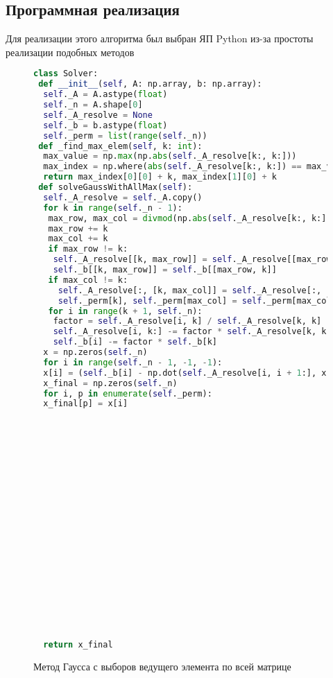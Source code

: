 \documentclass[a4paper,12pt]{article}
\begin{document}
	\subsection{Программная реализация}
	Для реализации этого алгоритма был выбран ЯП Python из-за простоты реализации подобных методов
	\begin{figure} %
		
		\begin{lstlisting}[language=Python]
class Solver:
 def __init__(self, A: np.array, b: np.array):
  self._A = A.astype(float)
  self._n = A.shape[0]
  self._A_resolve = None
  self._b = b.astype(float)
  self._perm = list(range(self._n))
 def _find_max_elem(self, k: int):
  max_value = np.max(np.abs(self._A_resolve[k:, k:]))
  max_index = np.where(abs(self._A_resolve[k:, k:]) == max_value)
  return max_index[0][0] + k, max_index[1][0] + k
 def solveGaussWithAllMax(self):
  self._A_resolve = self._A.copy() 
  for k in range(self._n - 1):	
   max_row, max_col = divmod(np.abs(self._A_resolve[k:, k:]).argmax(), self._n - k)
   max_row += k
   max_col += k	
   if max_row != k:
    self._A_resolve[[k, max_row]] = self._A_resolve[[max_row, k]]
    self._b[[k, max_row]] = self._b[[max_row, k]]
   if max_col != k:
     self._A_resolve[:, [k, max_col]] = self._A_resolve[:, [max_col, k]]
     self._perm[k], self._perm[max_col] = self._perm[max_col], self._perm[k]
   for i in range(k + 1, self._n):
    factor = self._A_resolve[i, k] / self._A_resolve[k, k]
    self._A_resolve[i, k:] -= factor * self._A_resolve[k, k:]
    self._b[i] -= factor * self._b[k]
  x = np.zeros(self._n)
  for i in range(self._n - 1, -1, -1):
  x[i] = (self._b[i] - np.dot(self._A_resolve[i, i + 1:], x[i + 1:])) / self._A_resolve[i, i]
  x_final = np.zeros(self._n)
  for i, p in enumerate(self._perm):
  x_final[p] = x[i]




















  return x_final
		\end{lstlisting}
		
		\caption{Метод Гаусса с выборов ведущего элемента по всей матрице}
	\end{figure}
	
	\newpage
	
\end{document}
